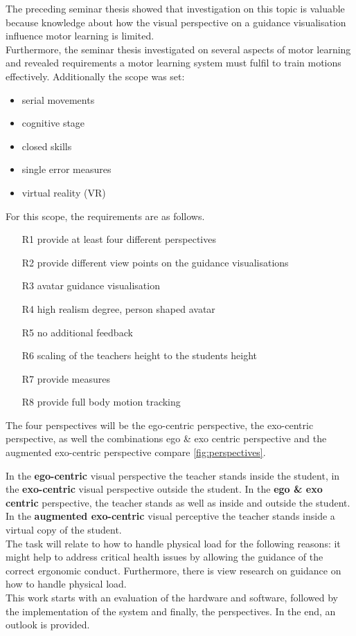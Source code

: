 The preceding seminar thesis showed that investigation on this topic is valuable because knowledge about how the visual perspective on a guidance visualisation influence motor learning is limited.\\
Furthermore, the seminar thesis investigated on several aspects of motor learning and revealed requirements a motor learning system must fulfil to train motions effectively. Additionally the scope was set:
\begin{itemize}
	\item serial movements
	\item cognitive stage
	\item closed skills
	\item single error measures
	\item virtual reality (VR)
\end{itemize}
For this scope, the requirements are as follows.
\begin{itemize}
	\item[R1] provide at least four different perspectives
	\item[R2] provide different view points on the guidance visualisations
	\item[R3] avatar guidance visualisation
	\item[R4] high realism degree, person shaped avatar
	\item[R5] no additional feedback
	\item[R6] scaling of the teachers height to the students height
	\item[R7] provide measures
	\item[R8] provide full body motion tracking
\end{itemize}
The four perspectives will be the ego-centric perspective, the exo-centric perspective, as well the combinations ego \& exo centric perspective and the augmented exo-centric perspective compare \ref{fig:perspectives}.

In the \textbf{ego-centric} visual perspective the teacher stands inside the student, in the \textbf{exo-centric} visual perspective outside the student. In the \textbf{ego \& exo centric} perspective, the teacher stands as well as inside and outside the student. In the \textbf{augmented exo-centric} visual perceptive the teacher stands inside a virtual copy of the student.\\
The task will relate to how to handle physical load for the following reasons: it might help to address critical health issues by allowing the guidance of the correct ergonomic conduct. Furthermore, there is view research on guidance on how to handle physical load.\\
This work starts with an evaluation of the hardware and software, followed by the implementation of the system and finally, the perspectives. In the end, an outlook is provided.

